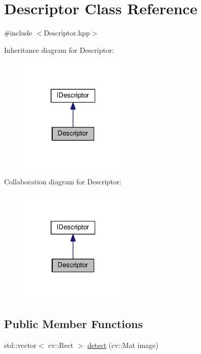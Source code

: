 \hypertarget{classDescriptor}{}\section{Descriptor Class Reference}
\label{classDescriptor}


{\ttfamily \#include $<$Descriptor.\+hpp$>$}



Inheritance diagram for Descriptor\+:
\nopagebreak
\begin{figure}[H]
\begin{center}
\leavevmode
\includegraphics[width=145pt]{classDescriptor__inherit__graph}
\end{center}
\end{figure}


Collaboration diagram for Descriptor\+:
\nopagebreak
\begin{figure}[H]
\begin{center}
\leavevmode
\includegraphics[width=145pt]{classDescriptor__coll__graph}
\end{center}
\end{figure}
\subsection*{Public Member Functions}
\begin{DoxyCompactItemize}
\item 
std\+::vector$<$ cv\+::\+Rect $>$ \hyperlink{classDescriptor_a86ffd0cfea1cceb0d8fae834d4cef400}{detect} (cv\+::\+Mat image)
\end{DoxyCompactItemize}
